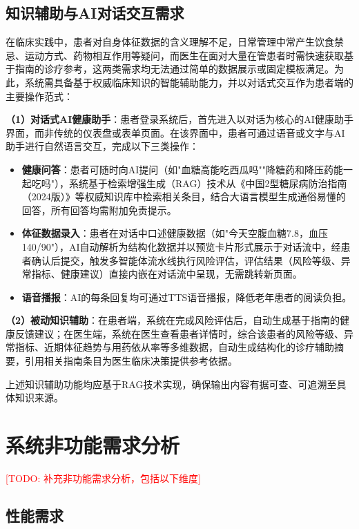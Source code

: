 \subsection{知识辅助与AI对话交互需求}

在临床实践中，患者对自身体征数据的含义理解不足，日常管理中常产生饮食禁忌、运动方式、药物相互作用等疑问，而医生在面对大量在管患者时需快速获取基于指南的诊疗参考，这两类需求均无法通过简单的数据展示或固定模板满足。为此，系统需具备基于权威临床知识的智能辅助能力，并以对话式交互作为患者端的主要操作范式：

\textbf{（1）对话式AI健康助手}：患者登录系统后，首先进入以对话为核心的AI健康助手界面，而非传统的仪表盘或表单页面。在该界面中，患者可通过语音或文字与AI助手进行自然语言交互，完成以下三类操作：

\begin{itemize}
  \item \textbf{健康问答}：患者可随时向AI提问（如"血糖高能吃西瓜吗""降糖药和降压药能一起吃吗"），系统基于检索增强生成（RAG）技术从《中国2型糖尿病防治指南（2024版）》等权威知识库中检索相关条目，结合大语言模型生成通俗易懂的回答，所有回答均需附加免责提示。
  \item \textbf{体征数据录入}：患者在对话中口述健康数据（如"今天空腹血糖7.8，血压140/90"），AI自动解析为结构化数据并以预览卡片形式展示于对话流中，经患者确认后提交，触发多智能体流水线执行风险评估，评估结果（风险等级、异常指标、健康建议）直接内嵌在对话流中呈现，无需跳转新页面。
  \item \textbf{语音播报}：AI的每条回复均可通过TTS语音播报，降低老年患者的阅读负担。
\end{itemize}

\textbf{（2）被动知识辅助}：在患者端，系统在完成风险评估后，自动生成基于指南的健康反馈建议；在医生端，系统在医生查看患者详情时，综合该患者的风险等级、异常指标、近期体征趋势与用药依从率等多维数据，自动生成结构化的诊疗辅助摘要，引用相关指南条目为医生临床决策提供参考依据。

上述知识辅助功能均应基于RAG技术实现，确保输出内容有据可查、可追溯至具体知识来源。


\section{系统非功能需求分析}

\textcolor{red}{[TODO: 补充非功能需求分析，包括以下维度]}

\subsection{性能需求}

